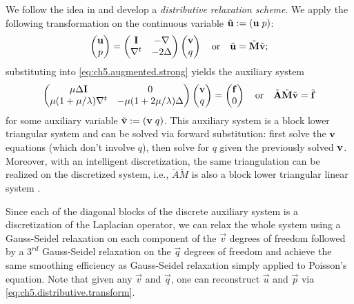 We follow the idea in \cite{Zhu.Yongning10} and develop a \emph{distributive relaxation scheme}. We apply the following transformation on the continuous variable $\tilde{\mathbf{u}} := (\mathbf{u} \; p)$:
\begin{equation} \label{eq:ch5.distributive.transform}
\begin{pmatrix} \mathbf{u} \\ p \end{pmatrix}
= \begin{pmatrix} \mathbf{I} & -\nabla \\ \nabla^t & -2 \Delta \end{pmatrix}
\begin{pmatrix} \mathbf{v} \\ q \end{pmatrix}
\quad \text{or} \quad
\tilde{\mathbf{u}} = \tilde{\mathbf{M}} \tilde{\mathbf{v}};
\end{equation}
substituting into \eqref{eq:ch5.augmented.strong} yields the auxiliary system
\begin{equation} \label{eq:ch5.distributive.triangularized}
\begin{pmatrix} \mu \Delta \mathbf{I} & 0 \\ \mu (1 + \mu / \lambda) \nabla^t & -\mu (1 + 2\mu / \lambda) \Delta \end{pmatrix}
\begin{pmatrix} \mathbf{v} \\ q \end{pmatrix}
= \begin{pmatrix} \mathbf{f} \\ 0 \end{pmatrix}
\quad \text{or} \quad
\tilde{\mathbf{A}} \tilde{\mathbf{M}} \tilde{\mathbf{v}} = \tilde{\mathbf{f}}
\end{equation}
for some auxiliary variable $\tilde{\mathbf{v}} := (\mathbf{v} \; q)$. This auxiliary system is a block lower triangular system and can be solved via forward substitution: first solve the $\mathbf{v}$ equations (which don't involve $q$), then solve for $q$ given the previously solved $\mathbf{v}$. Moreover, with an intelligent discretization, the same triangulation can be realized on the discretized system, i.e., $\tilde{A} \tilde{M}$ is also a block lower triangular linear system \cite{Zhu.Yongning10}.

Since each of the diagonal blocks of the discrete auxiliary system is a discretization of the Laplacian operator, we can relax the whole system using a Gauss-Seidel relaxation on each component of the $\vec{v}$ degrees of freedom followed by a $3^{rd}$ Gauss-Seidel relaxation on the $\vec{q}$ degrees of freedom and achieve the same smoothing efficiency as Gauss-Seidel relaxation simply applied to Poisson's equation. Note that given any $\vec{v}$ and $\vec{q}$, one can reconstruct $\vec{u}$ and $\vec{p}$ via \eqref{eq:ch5.distributive.transform}.

